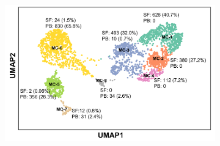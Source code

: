 \begin{figure}[H]
	\centering
	\begin{subfigure}[b]{0.65\textwidth}
		\centering 
		\includegraphics[width=\textwidth]{./Results3/pdfs/PSA_monocytes_scanpy_single_cell_cluster_UMAP}
		\caption{}
	\end{subfigure}
	~
	\begin{subfigure}[b]{0.35\textwidth} 
		\centering

\end{subfigure}
\end{figure}
